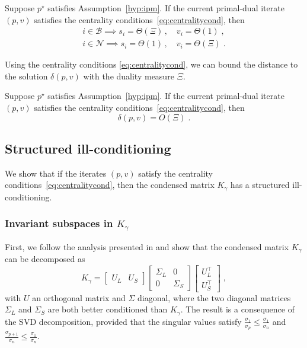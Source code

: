 \begin{proposition}
  \label{prop:cond:boundslack}
  Suppose $p^\star$ satisfies Assumption~\ref{hyp:ipm}.
  If the current primal-dual iterate $(p, v)$ satisfies the centrality
  conditions~\eqref{eq:centralitycond}, then
  \begin{subequations}
    \begin{align}
      i \in \mathcal{B} \implies s_i = \Theta(\Xi) \, , \quad v_i = \Theta(1) \;, \\
      i \in \mathcal{N} \implies s_i = \Theta(1) \, , \quad v_i = \Theta(\Xi) \; .
    \end{align}
  \end{subequations}
\end{proposition}
Using the centrality conditions \eqref{eq:centralitycond}, we can bound
the distance to the solution $\delta(p, v)$ with the duality measure $\Xi$.
\begin{theorem}
  Suppose $p^\star$ satisfies Assumption~\ref{hyp:ipm}.
  If the current primal-dual iterate $(p, v)$ satisfies the centrality
  conditions~\eqref{eq:centralitycond}, then
  \begin{equation}
    \delta(p, v) = O(\Xi) \; .
  \end{equation}
\end{theorem}

\subsection{Structured ill-conditioning}
We show that if the iterates $(p, v)$ satisfy
the centrality conditions~\eqref{eq:centralitycond}, then the
condensed matrix $K_\gamma$ has a structured ill-conditioning.

\subsubsection{Invariant subspaces in $K_\gamma$}
First, we follow the analysis presented in \cite{wright1998ill}
and show that the condensed matrix $K_\gamma$ can be decomposed as
\begin{equation}
  \label{eq:cond:svd}
  K_\gamma = \begin{bmatrix} U_L & U_S \end{bmatrix}
  \begin{bmatrix}
    \Sigma_L & 0 \\ 0 & \Sigma_S
  \end{bmatrix}
  \begin{bmatrix}
    U_L^\top \\ U_S^\top
  \end{bmatrix}
  \; ,
\end{equation}
with $U$ an orthogonal matrix and $\Sigma$ diagonal, where
the two diagonal matrices $\Sigma_L$ and $\Sigma_S$ are both better conditioned than $K_\gamma$.
The result is a consequence of the SVD decomposition,
provided that the singular values satisfy $\frac{\sigma_1}{\sigma_{p}} \leq \frac{\sigma_1}{\sigma_n}$
and $\frac{\sigma_{p+1}}{\sigma_{n}} \leq \frac{\sigma_1}{\sigma_n}$.

